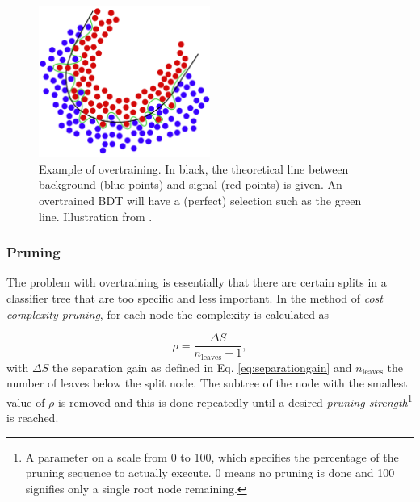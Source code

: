 \begin{figure}[t]
\centering
\includegraphics[width=0.5\textwidth]{chapter7/img/overtraining.png}
\caption{Example of overtraining. In black, the theoretical line between background (blue points) and signal (red points) is given. An overtrained BDT will have a (perfect) selection such as the green line. Illustration from \cite{boserpdf}.}
\label{fig:overtrainingexplained}
\end{figure}

\subsubsection{Pruning}
\label{subsub:pruning}
The problem with overtraining is essentially that there are certain splits in a classifier tree that are too specific and less important. In the method of \textit{cost complexity pruning}, for each node the complexity is calculated as

\begin{equation}
\rho = \frac{\Delta S}{n_{\textrm{leaves}} -1},
\end{equation}
\noindent with $\Delta S$ the separation gain as defined in Eq. \ref{eq:separationgain} and $n_\textrm{leaves}$ the number of leaves below the split node. The subtree of the node with the smallest value of $\rho$ is removed and this is done repeatedly until a desired \textit{pruning strength}\footnote{A parameter on a scale from 0 to 100, which specifies the percentage of the pruning sequence to actually execute. 0 means no pruning is done and 100 signifies only a single root node remaining.} is reached.\\
\newline
